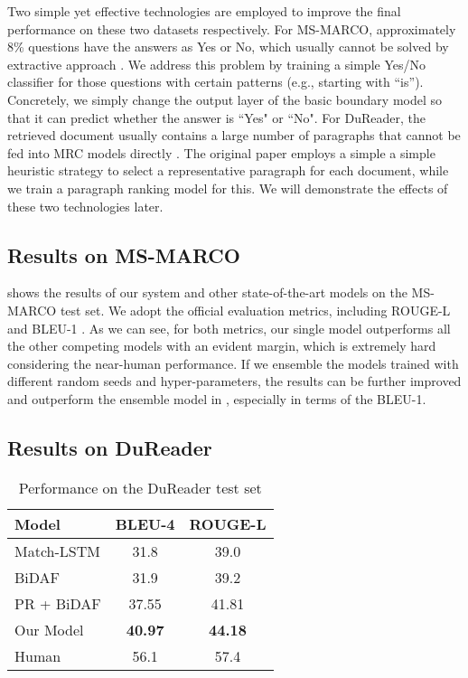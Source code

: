 Two simple yet effective technologies are employed to improve the final performance on these two datasets respectively. For MS-MARCO, approximately 8\% questions have the answers as Yes or No, which usually cannot be solved by extractive approach \cite{snet}. We address this problem by training a simple Yes/No classifier for those questions with certain patterns (e.g., starting with ``is''). Concretely, we simply change the output layer of the basic boundary model so that it can predict whether the answer is ``Yes" or ``No". For DuReader, the retrieved document usually contains a large number of paragraphs that cannot be fed into MRC models directly \cite{dureader}. The original paper employs a simple a simple heuristic strategy to select a representative paragraph for each document, while we train a paragraph ranking model for this. We will demonstrate the effects of these two technologies later.


    
\subsection{Results on MS-MARCO}

 shows the results of our system and other state-of-the-art models on the MS-MARCO test set. We adopt the official evaluation metrics, including ROUGE-L \cite{rouge} and BLEU-1 \cite{bleu}. As we can see, for both metrics, our single model outperforms all the other competing models with an evident margin, which is extremely hard considering the near-human performance. If we ensemble the models trained with different random seeds and hyper-parameters, the results can be further improved and outperform the ensemble model in , especially in terms of the BLEU-1. 


\subsection{Results on DuReader}

\begin{table}[tbp]
\centering
\begin{tabular}{|l|c|c|}
\hline
Model        & BLEU-4 & ROUGE-L \\ \hline
Match-LSTM   & 31.8   & 39.0  \\ 
BiDAF        & 31.9   & 39.2  \\
PR + BiDAF   & 37.55   & 41.81  \\ 
Our Model    & \textbf{40.97}   &  \textbf{44.18} \\ \hline
Human          & 56.1 & 57.4 \\ \hline
\end{tabular}
\caption{Performance on the DuReader test set}
\label{tab:dureader-results}
\end{table}

